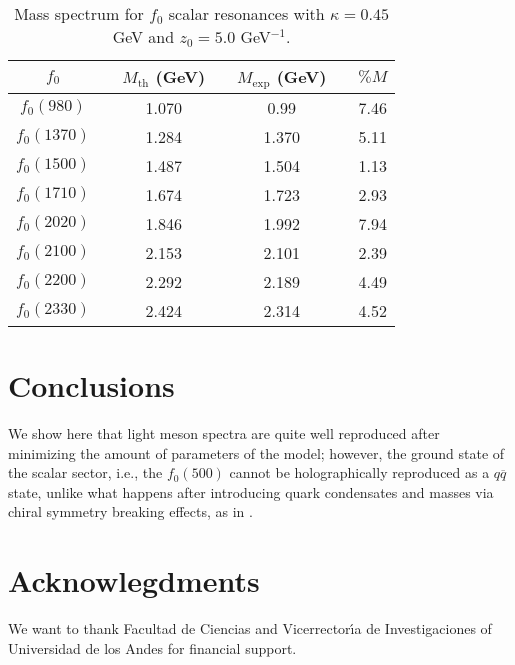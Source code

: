 \documentclass{PoS}
\begin{document}
\begin{table}[H]
\centering
\begin{tabular}{ccccccc}   \hline \hline
	$f_{0}$ & & $M_{\text{th}}$ (GeV)& & $M_{\text{exp}}$ (GeV) & & $\% M$  \\ \hline
	$f_{0}(980)$ & & 1.070  & & 0.99 & & 7.46  \\ 
	$f_{0}(1370)$  & & 1.284 & & 1.370  & &  5.11 \\
	$f_{0}(1500)$ & & 1.487 & & 1.504 & & 1.13 \\
	$f_{0}(1710)$ & & 1.674 & & 1.723 & & 2.93 \\ 
	$f_{0}(2020)$ & & 1.846 & & 1.992 & & 7.94 \\
	$f_{0}(2100)$ & & 2.153 & & 2.101 & & 2.39   \\ 
	$f_{0}(2200)$ & & 2.292 & & 2.189 & & 4.49   \\  
	$f_{0}(2330)$ & & 2.424 & & 2.314 & & 4.52   \\  \hline \hline
\end{tabular}
\caption{Mass spectrum for $f_{0}$ scalar resonances with $\kappa=0.45$ GeV and $z_0=5.0$ GeV$^{-1}$.}
\label{tab:scalmes}
\end{table}

\section{Conclusions} 

We show here that light meson spectra are quite well reproduced after minimizing the amount of parameters of the model; however, the ground state of the scalar sector, i.e., the $f_{0}(500)$ cannot be holographically reproduced as a $q\overline{q}$ state, unlike what happens after introducing quark condensates and masses via chiral symmetry breaking effects, as in \cite{Vega:2010ne,kapusta}.

\section*{Acknowlegdments}

We want to thank Facultad de Ciencias and Vicerrector\'{\i}a de Investigaciones of Universidad de los Andes for financial support.
\end{document}
